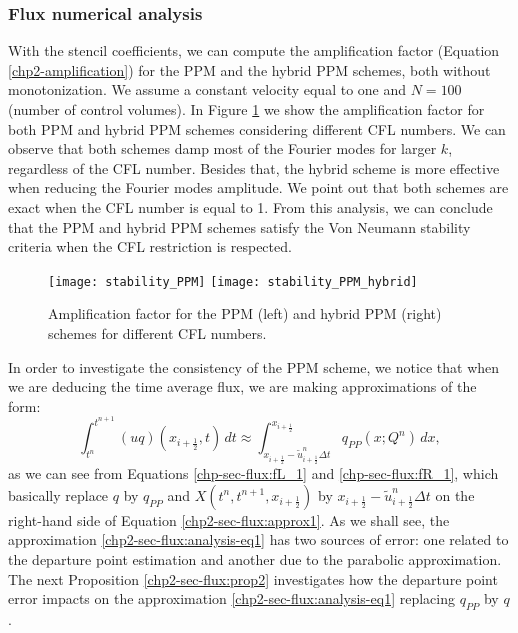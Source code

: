 \subsubsection{Flux numerical analysis}
With the stencil coefficients, we can compute the amplification factor 
(Equation \eqref{chp2-amplification}) for the PPM and the hybrid PPM schemes, both without monotonization.
We assume a constant velocity equal to one and $N=100$ (number of control volumes).
In Figure \ref{chp2-fig-amplification} we show the amplification factor for both PPM and hybrid PPM schemes
considering different CFL numbers.
We can observe that both schemes damp most of the Fourier modes for larger $k$, regardless of the CFL number.
Besides that, the hybrid scheme is more effective when reducing the Fourier modes amplitude.
We point out that both schemes are exact when the CFL number is equal to 1.
From this analysis, we can conclude that the PPM and hybrid PPM schemes satisfy the
Von Neumann stability criteria when the CFL restriction is respected.
\begin{figure}[ht]
	\centering
	\texttt{[image: stability\_PPM]}
	\texttt{[image: stability\_PPM\_hybrid]}
	\caption{Amplification factor for the PPM (left) and hybrid PPM (right) schemes for different CFL numbers.}
	\label{chp2-fig-amplification}
\end{figure}
In order to investigate the consistency of the PPM scheme, we notice that when we are deducing the time average flux, 
we are making approximations of the form:
\begin{equation}
	\label{chp2-sec-flux:analysis-eq1}
	\int_{t^n}^{t^{n+1}} (uq)(x_{i+\frac{1}{2}},t) \,dt \approx
	\int_{x_{i+\frac{1}{2}}-\tilde{u}_{i+\frac{1}{2}}^n \Delta t}^{x_{i+\frac{1}{2}}}
	q_{PP}(x;Q^n)\,dx, 
\end{equation}
as we can see from Equations \eqref{chp-sec-flux:fL_1} and \eqref{chp-sec-flux:fR_1},
which basically replace $q$ by $q_{PP}$ and $X(t^n, t^{n+1},x_{i+\frac{1}{2}})$ by 
$x_{i+\frac{1}{2}}-\tilde{u}_{i+\frac{1}{2}}^n \Delta t$
on the right-hand side of Equation \eqref{chp2-sec-flux:approx1}.
As we shall see, the approximation \eqref{chp2-sec-flux:analysis-eq1}
has two sources of error: one related to the departure point estimation and another due to the
parabolic approximation.
The next Proposition \eqref{chp2-sec-flux:prop2} investigates how the departure point error
impacts on the approximation \eqref{chp2-sec-flux:analysis-eq1} replacing $q_{PP}$ by $q$.

